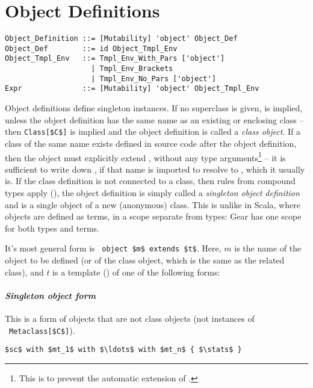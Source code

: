 \section{Object Definitions}
\label{sec:object-definitions}

\syntax\begin{lstlisting}
Object_Definition ::= [Mutability] 'object' Object_Def
Object_Def        ::= id Object_Tmpl_Env
Object_Tmpl_Env   ::= Tmpl_Env_With_Pars ['object']
                    | Tmpl_Env_Brackets
                    | Tmpl_Env_No_Pars ['object']
Expr              ::= [Mutability] 'object' Object_Tmpl_Env
\end{lstlisting}

Object definitions define singleton instances. If no superclass is given,  is implied, unless the object definition has the same name as an existing or enclosing class -- then \lstinline!Class[$C$]! is implied and the object definition is called a {\em class object}. If a class of the same name exists defined in source code after the object definition, then the object must explicitly extend , without any type arguments\footnote{This is to prevent the automatic extension of .} -- it is sufficient to write down , if that name is imported to resolve to , which it usually is. If the class definition is not connected to a class, then rules from compound types apply (), the object definition is simply called a {\em singleton object definition} and is a single object of a new (anonymous) class. This is unlike in Scala, where objects are defined as terms, in a scope separate from types: Gear has one scope for both types and terms. 

It's most general form is ~\lstinline!object $m$ extends $t$!. Here, $m$ is the name of the object to be defined (or of the class object, which is the same as the related class), and $t$ is a template () of one of the following forms:

\paragraph{\em Singleton object form}
This is a form of objects that are not class objects (not instances of ~\lstinline!Metaclass[$C$]!). 
\begin{lstlisting}
$sc$ with $mt_1$ with $\ldots$ with $mt_n$ { $\stats$ }
\end{lstlisting}

